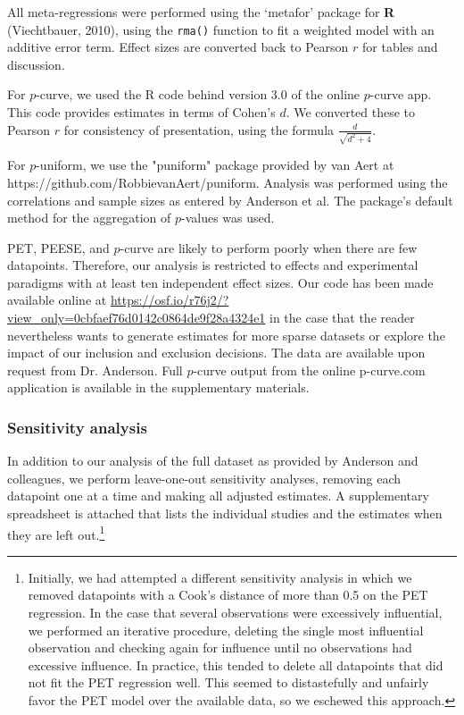 \documentclass[man, mask]{apa6}
\begin{document}
All meta-regressions were performed using the `metafor' package for {\bf R} (Viechtbauer, 2010), using the {\tt rma()} function to fit a weighted model with an additive error term. Effect sizes are converted back to Pearson $r$ for tables and discussion. 
\nocite{Viechtbauer:2010} 

For $p$-curve, we used the R code behind version 3.0 of the online $p$-curve app. This code provides estimates in terms of Cohen's $d$. We converted these to Pearson $r$ for consistency of presentation, using the formula $\frac{d}{\sqrt{d^2+4}}$.

For $p$-uniform, we use the "puniform" package provided by van Aert at https://github.com/RobbievanAert/puniform. Analysis was performed using the correlations and sample sizes as entered by Anderson et al. The package's default method for the aggregation of $p$-values was used.

PET, PEESE, and $p$-curve are likely to perform poorly when there are few datapoints. Therefore, our analysis is restricted to effects and experimental paradigms with at least ten independent effect sizes. %
Our code has been made available online at \url{https://osf.io/r76j2/?view\_only=0cbfaef76d0142c0864de9f28a4324e1} in the case that the reader nevertheless wants to generate estimates for more sparse datasets or explore the impact of our inclusion and exclusion decisions. The data are available upon request from Dr. Anderson. Full $p$-curve output from the online p-curve.com application is available in the supplementary materials.%

\subsubsection{Sensitivity analysis}
In addition to our analysis of the full dataset as provided by Anderson and colleagues, we perform leave-one-out sensitivity analyses, removing each datapoint one at a time and making all adjusted estimates. A supplementary spreadsheet is attached that lists the individual studies and the estimates when they are left out.\footnote{Initially, we had attempted a different sensitivity analysis in which we removed datapoints with a Cook's distance of more than 0.5 on the PET regression. In the case that several observations were excessively influential, we performed an iterative procedure, deleting the single most influential observation and checking again for influence until no observations had excessive influence. In practice, this tended to delete all datapoints that did not fit the PET regression well. This seemed to distastefully and unfairly favor the PET model over the available data, so we eschewed this approach.}
\end{document}
